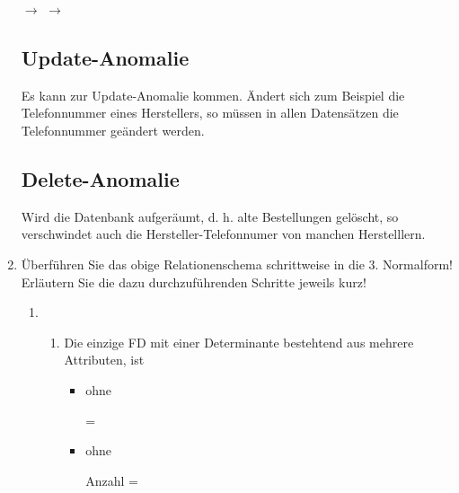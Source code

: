 \documentclass{lehramt-informatik-aufgabe}
\begin{document}
\begin{enumerate}
\begin{liAntwort}
\bigskip

$\rightarrow$ 
$\rightarrow$ 

\subsection*{Update-Anomalie}

Es kann zur Update-Anomalie kommen. Ändert sich zum Beispiel die
Telefonnummer eines Herstellers, so müssen in allen
Datensätzen die Telefonnummer geändert werden.

\subsection*{Delete-Anomalie}

Wird die Datenbank aufgeräumt, d. h. alte Bestellungen gelöscht,
so verschwindet auch die Hersteller-Telefonnumer von manchen
Herstelllern.
\end{liAntwort}


\item Überführen Sie das obige Relationenschema schrittweise in die 3.
Normalform! Erläutern Sie die dazu durchzuführenden Schritte jeweils
kurz!

\begin{liAntwort}

\begin{enumerate}
\item {}

\begin{enumerate}
\item {}

Die einzige FD mit einer Determinante bestehtend aus mehrere Attributen,
ist 

\begin{itemize}
\item ohne 

\begin{liAHuelle}
 \notin {} = \\
\end{liAHuelle}

\item ohne 

\begin{liAHuelle}
Anzahl \notin {} = \\
\end{liAHuelle}


\end{itemize}
\end{enumerate}
\end{enumerate}
\end{liAntwort}
\end{enumerate}
\end{document}
